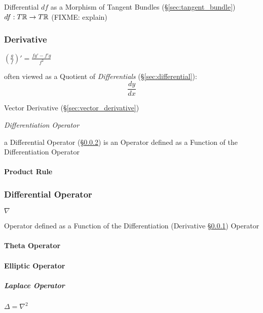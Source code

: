 Differential $df$ as a Morphism of Tangent Bundles (\S\ref{sec:tangent_bundle})
$df : T\mathbb{R} \rightarrow T\mathbb{R}$ (FIXME: explain)



\subsubsection{Derivative}\label{sec:derivative}

$(\frac{g}{f})' = \frac{f g' - f' g}{f^2}$

often viewed as a Quotient of \emph{Differentials} (\S\ref{sec:differential}):
\[
  \frac{dy}{dx}
\]

\fist Vector Derivative (\S\ref{sec:vector_derivative})

\emph{Differentiation Operator}

a Differential Operator (\S\ref{sec:differential_operator}) is an Operator
defined as a Function of the Differentiation Operator



\paragraph{Product Rule}\label{sec:product_rule}\hfill



\subsubsection{Differential Operator}\label{sec:differential_operator}


$\nabla$

Operator defined as a Function of the Differentiation (Derivative
\S\ref{sec:derivative}) Operator



\paragraph{Theta Operator}\label{sec:theta_operator}\hfill

\paragraph{Elliptic Operator}\label{sec:elliptic_operator}\hfill

\subparagraph{Laplace Operator}\label{sec:laplace_operator}\hfill

$\Delta = \nabla^2$

